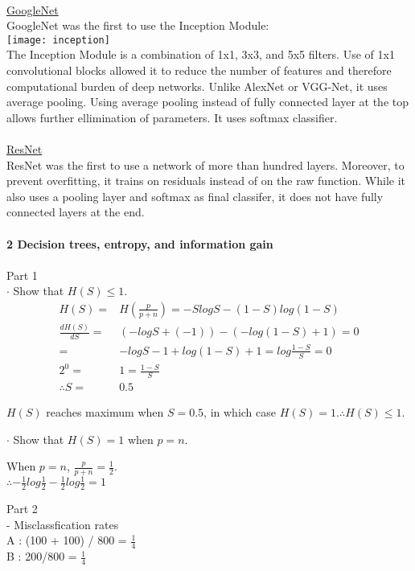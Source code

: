 \documentclass[12pt]{article}
\begin{document}
\\
\underline{GoogleNet}\\
GoogleNet was the first to use the Inception Module:\\
\texttt{[image: inception]}\\
The Inception Module is a combination of 1x1, 3x3, and 5x5 filters. Use of 1x1 convolutional blocks allowed it to reduce the number of features and therefore computational burden of deep networks. Unlike AlexNet or VGG-Net, it uses average pooling. Using average pooling instead of fully connected layer at the top allows further ellimination of parameters. It uses softmax classifier. \\
\\
\underline{ResNet}\\
ResNet was the first to use a network of more than hundred layers. Moreover, to prevent overfitting, it trains on residuals instead of on the raw function. While it also uses a pooling layer and softmax as final classifer, it does not have fully connected layers at the end. \\
\\
\noindent \textbf{2 Decision trees, entropy, and information gain} \\
\\ 
\noindent Part 1\\
\indent $\cdot$ Show that $H(S) \leq 1$.
	\begin{align*}
	H(S) =& H(\frac{p}{p+n}) = -S log S - (1-S) log (1-S) \\
	\frac{dH(S)}{dS} =& (-log S + (-1)) - (-log (1-S) + 1) = 0\\
	=& -logS - 1 + log (1-S) + 1 = log \frac{1-S}{S} = 0 \\
	2^{0} =& 1 = \frac{1-S}{S}\\  
	\therefore S =& 0.5 
	\end{align*}
	\begin{center}
	$H(S)$ reaches maximum when $S = 0.5$, in which case $H(S) = 1. \therefore H(S) \leq 1$. \\
	\end{center}
	
\indent $\cdot$ Show that $H(S) = 1$ when $p=n$.
	\begin{center}
	When $p=n$, $\frac{p}{p+n} = \frac{1}{2}$. \\
	 
	$\therefore -\frac{1}{2} log \frac{1}{2} - \frac{1}{2} log \frac{1}{2} = 1$\\	
	\end{center}
\noindent Part 2\\
\indent - Misclassfication rates\\
\indent \indent A : (100 + 100) / 800 = $\frac{1}{4}$\\
\indent \indent B : 200/800 = $\frac{1}{4}$\\
\end{document}
